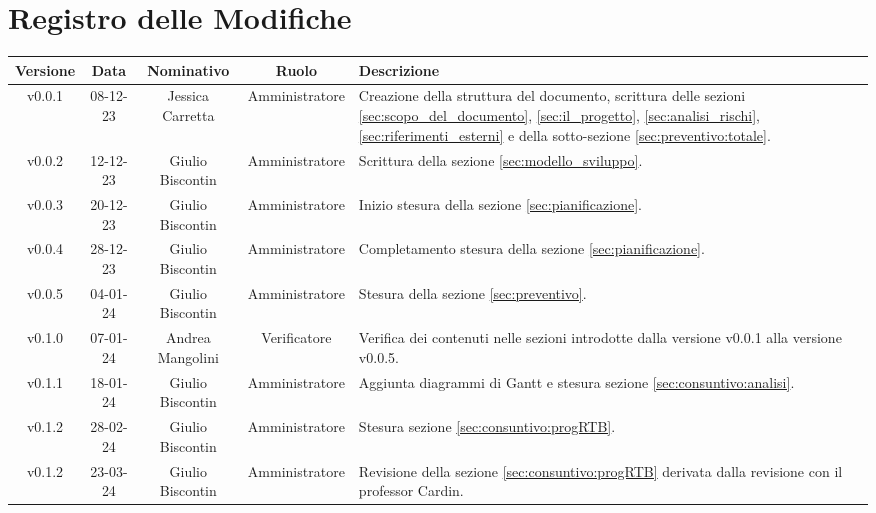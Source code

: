 \section*{\Large Registro delle Modifiche}
    \begin{table}[h]
        \centering
        \renewcommand\tabularxcolumn[1]{m{#1}} %
        \renewcommand{\arraystretch}{1.5}
        \begin{tabularx}{0.98\textwidth}
            {c|c|c|c|>{\centering\arraybackslash}X}
            \rowcolor{black}
            \textbf{\color{white} Versione} & \textbf{\color{white} Data} & \textbf{\color{white} Nominativo} & \textbf{\color{white} Ruolo} & \textbf{\color{white} Descrizione} \\ 
            \hline

            v0.0.1 & 08-12-23 & Jessica Carretta & Amministratore & Creazione della struttura del documento, scrittura delle sezioni \ref{sec:scopo_del_documento}, \ref{sec:il_progetto}, \ref{sec:analisi_rischi}, \ref{sec:riferimenti_esterni} e della sotto-sezione \ref{sec:preventivo:totale}. \\
            
            v0.0.2 & 12-12-23 & Giulio Biscontin & Amministratore & Scrittura della sezione \ref{sec:modello_sviluppo}. \\
            
            v0.0.3 & 20-12-23 & Giulio Biscontin & Amministratore & Inizio stesura della sezione \ref{sec:pianificazione}. \\
            
            v0.0.4 & 28-12-23 & Giulio Biscontin & Amministratore & Completamento stesura della sezione \ref{sec:pianificazione}. \\
            
            v0.0.5 & 04-01-24 & Giulio Biscontin & Amministratore & Stesura della sezione \ref{sec:preventivo}. \\

            v0.1.0 & 07-01-24 & Andrea Mangolini & Verificatore & Verifica dei contenuti nelle sezioni introdotte dalla versione v0.0.1 alla versione v0.0.5. \\

            v0.1.1 & 18-01-24 & Giulio Biscontin & Amministratore & Aggiunta diagrammi di Gantt e stesura sezione \ref{sec:consuntivo:analisi}. \\

            v0.1.2 & 28-02-24 & Giulio Biscontin & Amministratore & Stesura sezione \ref{sec:consuntivo:progRTB}. \\
            
            v0.1.2 & 23-03-24 & Giulio Biscontin & Amministratore & Revisione della sezione \ref{sec:consuntivo:progRTB} derivata dalla revisione con il professor Cardin. \\

            \hline
        \end{tabularx}
    \end{table}